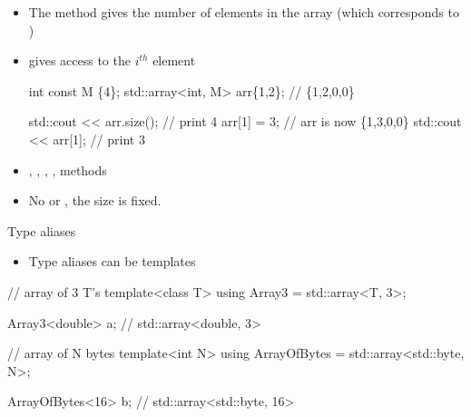 \begin{frame}[fragile]{ \insertcontinuationtext}

  \begin{itemize}
  \item The  method gives the number of elements in the array (which
    corresponds to )
  \item {} gives access to the $i^{th}$ element
    \begin{codeblock}
int const M \{4\};
std::array<int, M> arr\{1,2\}; // \{1,2,0,0\}

std::cout << arr.size(); // print 4
arr[1] = 3;              // arr is now \{1,3,0,0\}
std::cout << arr[1];     // print 3\end{codeblock}

  \item {}, , , ,  methods
  \item No  or , the size is fixed.
  \end{itemize}

\end{frame}

\begin{frame}[fragile]{Type aliases \insertcontinuationtext}

  \begin{itemize}
  \item Type aliases can be templates
  \end{itemize}

  \begin{codeblock}
// array of 3 T's
template<class \alert{T}> using Array3 = std::array<\alert{T}, 3>;

Array3<\alert{double}> a; // std::array<double, 3>\end{codeblock}

  \begin{codeblock}
// array of N bytes
template<int \alert{N}> using ArrayOfBytes = std::array<std::byte, \alert{N}>;

ArrayOfBytes<\alert{16}> b; // std::array<std::byte, 16>\end{codeblock}
\end{frame}

